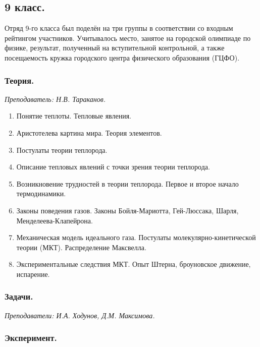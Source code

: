 \documentclass[12pt]{article}
\newlength{\h}
\newlength{\x}
\begin{document}
\clearpage

\restoregeometry


\subsection{9 класс.}
\label{sec:daily9}

Отряд 9-го класса был поделён на три группы в соответствии со входным
рейтингом участников. Учитывалось место, занятое на городской
олимпиаде по физике, результат, полученный на вступительной
контрольной, а также посещаемость кружка городского центра физического
образования (ГЦФО). 

\subsubsection{Теория.}
\label{sec:daily9th}

\textit{Преподаватель: Н.В. Тараканов.}\\

\begin{enumerate}
\item Понятие теплоты. Тепловые явления.
\item Аристотелева картина мира. Теория элементов.
\item Постулаты теории теплорода.
\item Описание тепловых явлений с точки зрения теории теплорода.
\item Возникновение трудностей в теории теплорода. Первое и второе
  начало термодинамики.
\item Законы поведения газов. Законы Бойля-Мариотта, Гей-Люссака,
  Шарля, Менделеева-Клапейрона.
\item Механическая модель идеального газа. Постулаты
  молекулярно-кинетической теории (МКТ). Распределение Максвелла.
\item Экспериментальные следствия МКТ. Опыт Штерна, броуновское
  движение, испарение.
\end{enumerate}

\subsubsection{Задачи.}
\label{sec:daily9pr}

\textit{Преподаватели: И.А. Ходунов, Д.М. Максимова.}\\

\subsubsection{Эксперимент.}
\label{sec:daily9exp}
\end{document}

